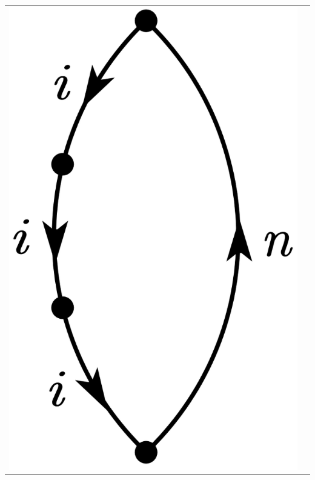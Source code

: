 \documentclass[a4paper]{book}
\newcounter{solution}[chapter]
\begin{document}
\begin{solution}
\begin{center}
\begin{tabular}{cc}
		\begin{minipage}{0.42\linewidth}
		\centering
		\includegraphics[scale=1.0,trim=0 -4 0 -4]{./pictures/6.02/2.png}
		\captionof*{figure}{$(-1)^{3+1} { \sum_n }^\prime \frac{ V_{ni} V^2_{ii} V_{in} }{ ( E^{(0)}_i - E^{(0)}_n)^3 }$}
		\end{minipage} \\
		

\end{tabular}
\end{center}
\end{solution}
\end{document}
